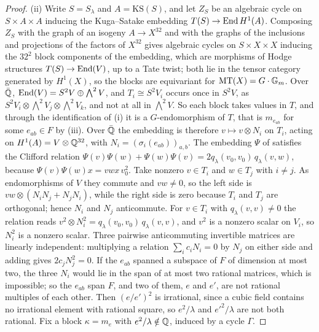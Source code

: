 \begin{proof}
(ii) Write $S=S_{\lambda}$ and $A=\mathrm{KS}(S)$, and let $Z_{S}$ be an
algebraic cycle on $S\times A\times A$ inducing the Kuga--Satake embedding
$T(S)\to\operatorname{End} H^{1}(A)$. Composing $Z_{S}$ with the graph of an isogeny
$A\to X^{32}$ and with the graphs of the inclusions and projections of the
factors of $X^{32}$ gives algebraic cycles on $S\times X\times X$ inducing the
$32^{2}$ block components of the embedding, which are morphisms of Hodge
structures $T(S)\to\operatorname{End}(V)$, up to a Tate twist; both lie in the tensor
category generated by $H^{1}(X)$, so the blocks are equivariant for
$\operatorname{MT}(X)=G\cdot\mathbb{G}_{m}$. Over $\bar{\mathbb{Q}}$,
$\operatorname{End}(V)=S^{2}V\oplus\bigwedge^{2}V$, and $T_{i}\cong S^{2}V_{i}$ occurs once
in $S^{2}V$, as $S^{2}V_{i}\otimes\bigwedge^{2}V_{j}\otimes\bigwedge^{2}V_{k}$,
and not at all in $\bigwedge^{2}V$. So each block takes values in $T$, and
through the identification of (i) it is a $G$-endomorphism of $T$, that is
$m_{e_{ab}}$ for some $e_{ab}\in F$ by (iii). Over
$\bar{\mathbb{Q}}$ the embedding is therefore $v\mapsto v\otimes N_{i}$ on $T_{i}$,
acting on $H^{1}(A)=V\otimes\mathbb{Q}^{32}$, with
$N_{i}=(\sigma_{i}(e_{ab}))_{a,b}$. The embedding $\Psi$ of
 satisfies the Clifford relation
$\Psi(v)\Psi(w)+\Psi(w)\Psi(v)=2q_{\lambda}(v_{0},v_{0})\,q_{\lambda}(v,w)$,
because
$\Psi(v)\Psi(w)x=vwx\,v_{0}^{2}$. Take nonzero $v\in T_{i}$ and
$w\in T_{j}$ with $i\ne j$. As endomorphisms of $V$ they commute and $vw\ne0$,
so the left side is $vw\otimes(N_{i}N_{j}+N_{j}N_{i})$, while the right side
is zero because $T_{i}$ and $T_{j}$ are orthogonal; hence $N_{i}$ and $N_{j}$
anticommute. For $v\in T_{i}$ with $q_{\lambda}(v,v)\ne0$ the relation reads
$v^{2}\otimes N_{i}^{2}=q_{\lambda}(v_{0},v_{0})\,q_{\lambda}(v,v)$, and $v^{2}$
is a nonzero scalar on $V_{i}$, so $N_{i}^{2}$ is a nonzero scalar. Three pairwise
anticommuting invertible matrices are linearly independent: multiplying a
relation $\sum_{i}c_{i}N_{i}=0$ by $N_{j}$ on either side and adding gives
$2c_{j}N_{j}^{2}=0$. If the $e_{ab}$ spanned a subspace of $F$ of dimension at
most two, the three $N_{i}$ would lie in the span of at most two rational
matrices, which is impossible; so the $e_{ab}$ span $F$, and two of them, $e$
and $e'$, are not rational multiples of each other. Then $(e/e')^{2}$ is irrational, since a cubic field
contains no irrational element with rational square, so $e^{2}/\lambda$ and
$e'^{2}/\lambda$ are not both rational. Fix a block $\kappa=m_{e}$ with
$e^{2}/\lambda\notin\mathbb{Q}$, induced by a cycle $\Gamma$.


\end{proof}
